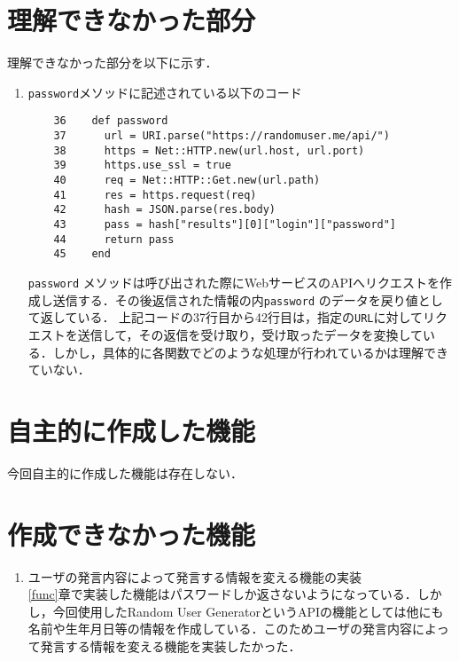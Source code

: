 \documentclass[12pt]{jsarticle}
\begin{document}
\section{理解できなかった部分}\label{sec3}
理解できなかった部分を以下に示す．
\begin{enumerate}
\item \verb|password|メソッドに記述されている以下のコード  
\begin{verbatim}
    36	  def password
    37	    url = URI.parse("https://randomuser.me/api/")
    38	    https = Net::HTTP.new(url.host, url.port)
    39	    https.use_ssl = true
    40	    req = Net::HTTP::Get.new(url.path)
    41	    res = https.request(req)
    42	    hash = JSON.parse(res.body)
    43	    pass = hash["results"][0]["login"]["password"] 
    44	    return pass
    45	  end
\end{verbatim}
\verb|password| メソッドは呼び出された際にWebサービスのAPIへリクエストを作成し送信する．その後返信された情報の内\verb|password| のデータを戻り値として返している．
上記コードの37行目から42行目は，指定の\verb|URL|に対してリクエストを送信して，その返信を受け取り，受け取ったデータを変換している．しかし，具体的に各関数でどのような処理が行われているかは理解できていない．
\end{enumerate}
   
\section{自主的に作成した機能}\label{sec4}
今回自主的に作成した機能は存在しない．

\section{作成できなかった機能}\label{sec5}
\begin{enumerate}
\item ユーザの発言内容によって発言する情報を変える機能の実装\\
  \ref{func}章で実装した機能はパスワードしか返さないようになっている．しかし，今回使用したRandom User GeneratorというAPIの機能としては他にも名前や生年月日等の情報を作成している．このためユーザの発言内容によって発言する情報を変える機能を実装したかった．
\end{enumerate}


\end{document}
